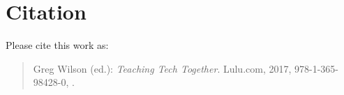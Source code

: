 \chapter{Citation}\label{s:citation}

Please cite this work as:

\begin{quote}
Greg Wilson (ed.): \emph{Teaching Tech Together}.
Lulu.com, 2017, 978-1-365-98428-0,
{\website}.
\end{quote}
